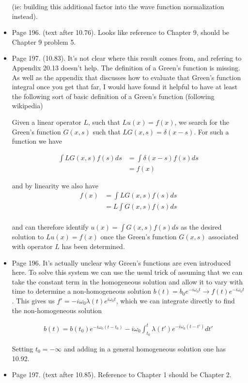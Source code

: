 \begin{itemize}
(ie: building this additional factor into the wave function normalization instead).
\item Page 196.  (text after 10.76).  Looks like reference to Chapter 9, should be Chapter 9 problem 5.
\item Page 197.  (10.83).  It's not clear where this result comes from, and refering to Appendix 20.13 doesn't help.  The definition of a Green's function is missing.  As well as the appendix that discusses how to evaluate that Green's function integral once you get that far, I would have found it helpful to have at least the following sort of basic definition of a Green's function (following wikipedia)

Given a linear operator $L$, such that $L u(x) = f(x)$, we search for the Green's function $G(x,s)$ such that $L G(x,s) = \delta(x-s)$.  For such a function we have

\begin{align*}
\int L G(x,s) f(s) ds 
&= \int \delta(x-s) f(s) ds \\
&= f(x)
\end{align*}

and by linearity we also have
\begin{align*}
f(x) 
&=
\int L G(x,s) f(s) ds \\
&= L \int G(x,s) f(s) ds \\
\end{align*}

and can therefore identify $u(x) = \int G(x,s) f(s) ds$ as the desired solution to $L u(x) = f(x)$ once the Green's function $G(x,s)$ associated with operator $L$ has been determined.

\item Page 196.  It's actually unclear why Green's functions are even introduced here.  To solve this system we can use the usual trick of assuming that we can take the constant term in the homogeneous solution and allow it to vary with time to determine a non-homogeneous solution $b(t) = b_0 e^{-i \omega_0 t} \rightarrow f(t) e^{-i\omega_0 t}$.  This gives us $f' = -i \omega_0 \lambda(t) e^{i \omega_0 t}$, which we can integrate directly to find the non-homogeneous solution

\begin{align*}
b(t) = b(t_0) e^{-i \omega_0 (t - t_0)} - i \omega_0 \int_{t_0}^t \lambda(t') e^{-i \omega_0 (t-t')} dt'
\end{align*}

Setting $t_0 = -\infty$ and adding in a general homogeneous solution one has 10.92.

\item Page 197.  (text after 10.85).  Reference to Chapter 1 should be Chapter 2.



\end{itemize}

\EndArticle
